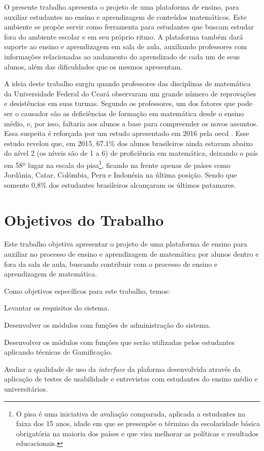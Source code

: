 O presente trabalho apresenta o projeto de uma plataforma de ensino, para auxiliar 
estudantes no ensino e aprendizagem de conteúdos matemáticos. Este ambiente se propõe servir como ferramenta para estudantes que buscam 
estudar fora do ambiente escolar e em seu próprio ritmo. A plataforma também dará suporte ao ensino e aprendizagem em sala de aula, 
auxiliando professores com informações relacionadas ao andamento do aprendizado de cada um de seus alunos, além das dificuldades que os 
mesmos apresentam.

A ideia deste trabalho surgiu quando professores das disciplinas de matemática da Universidade Federal do Cear\'a observaram um grande número de 
reprovações e desistências em suas turmas. Segundo os professores, um dos fatores que pode ser o causador são as deficiências de formação em matemática desde o ensino médio, e, por isso, faltaria aos alunos a base para compreender os novos assuntos. Essa suspeita é reforçada por um estudo apresentado em 2016 pela \gls{oecd} \cite{pisainfocus2016}. Esse estudo revelou que, em 2015, 67.1\% dos alunos brasileiros ainda estavam abaixo do nível 2 (os níveis são de 1 a 6) de proficiência em matem\'atica, deixando o país em 58º lugar na escala do \gls{pisa}\footnote{O \gls{pisa} é uma iniciativa de avaliação comparada, aplicada a estudantes na faixa dos 15 
anos, idade em que se pressupõe o término da escolaridade básica obrigatória na maioria dos países e que visa melhorar as políticas e 
resultados educacionais.}, ficando na frente apenas de países como Jordânia, Catar, Colômbia, Peru e Indonésia na \'ultima posi\c{c}\~ao. 
Sendo que somente 0,8\% dos estudantes brasileiros alcançaram os últimos patamares.

\section{Objetivos do Trabalho}

Este trabalho objetiva apresentar o projeto de uma plataforma de ensino para auxiliar no processo de ensino e aprendizagem de matemática por alunos dentro e 
fora da sala de aula, buscando contribuir com o processo de ensino e aprendizagem de matem\'atica. 

Como objetivos específicos para este trabalho, temos: 
\begin{alineas}
  \item Levantar os requisitos do sistema.
  \item Desenvolver os módulos com funções de administração do sistema.
  \item Desenvolver os módulos com funções que serão utilizadas pelos estudantes aplicando técnicas de Gamificação.
  \item Avaliar a qualidade de uso da \textit{interface} da plaforma desenvolvida através da aplicação de testes de usabilidade e entrevistas com estudantes do ensino m\'edio e universit\'arios.
\end{alineas}


